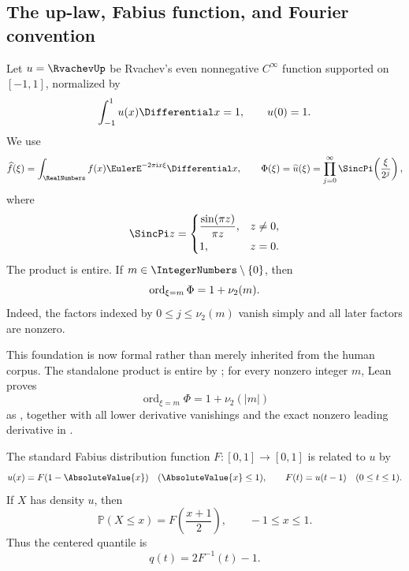 \documentclass[11pt,oneside]{article}
\numberwithin{equation}{section}
\theoremstyle{definition}
\theoremstyle{remark}
\begin{document}
\subsection{The up-law, Fabius function, and Fourier convention}

Let $u=\RvachevUp$ be Rvachev's even nonnegative $C^\infty$ function supported on $[-1,1]$, normalized by
\[
 \int_{-1}^{1}u(x)\Differential x=1,
 \qquad u(0)=1.
\]
We use
\begin{equation}
 \widehat f(\xi)=\int_{\RealNumbers}f(x)\EulerE^{-2\pi\iu x\xi}\Differential x,
 \qquad
 \Phi(\xi)=\widehat u(\xi)
 =\prod_{j=0}^{\infty}\SincPi\!\left(\frac{\xi}{2^j}\right),
 \label{p3:eq:Phi-product}
\end{equation}
where
\[
 \SincPi z=\begin{cases}\dfrac{\sin(\pi z)}{\pi z},&z\ne0,\\[0.4em]1,&z=0.\end{cases}
\]
The product is entire.  If $m\in\IntegerNumbers\setminus\{0\}$, then
\begin{equation}
 \operatorname{ord}_{\xi=m}\Phi=1+\nu_2(m).
 \label{p3:eq:integer-multiplicity}
\end{equation}
Indeed, the factors indexed by $0\le j\le\nu_2(m)$ vanish simply and all later factors are nonzero.

This foundation is now formal rather than merely inherited from the human
corpus.  The standalone product is entire by
; for every nonzero
integer \(m\), Lean proves
\[
 \operatorname{ord}_{\xi=m}\Phi=1+\nu_2(|m|)
\]
as , together with
all lower derivative vanishings and the exact nonzero leading derivative
in .

The standard Fabius distribution function $F:[0,1]\to[0,1]$ is related to $u$ by
\begin{equation}
 u(x)=F(1-\AbsoluteValue{x})\quad (\AbsoluteValue{x}\le1),
 \qquad
 F(t)=u(t-1)\quad(0\le t\le1).
 \label{p3:eq:F-up-relation}
\end{equation}
If $X$ has density $u$, then
\begin{equation}
 \mathbb P(X\le x)=F\!\left(\frac{x+1}{2}\right),
 \qquad -1\le x\le1.
 \label{p3:eq:centered-CDF}
\end{equation}
Thus the centered quantile is
\begin{equation}
 q(t)=2F^{-1}(t)-1.
 \label{p3:eq:centered-quantile}
\end{equation}
\end{document}
